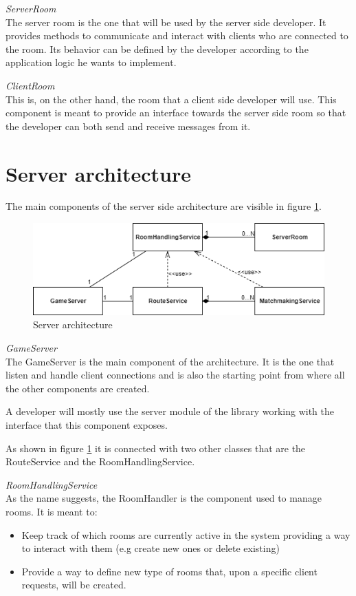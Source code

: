 \bigskip
\textit{ServerRoom}
\\
The server room is the one that will be used by the server side developer. It provides methods to communicate and interact with clients who are connected to the room. Its behavior can be defined by the developer according to the application logic he wants to implement.

\bigskip
\textit{ClientRoom}
\\
This is, on the other hand, the room that a client side developer will use. This component is meant to provide an interface towards the server side room so that the developer can both send and receive messages from it.

\section{Server architecture} \label{sec:server_arch}
The main components of the server side architecture are visible in figure \ref{fig:server_classes}. 

\begin{figure}[H]
	\centering
	\includegraphics[scale=0.7]{images/3-architecture/server-architecture.png}
	\caption{Server architecture}
	\label{fig:server_classes}
\end{figure}

\bigskip
\textit{GameServer}
\\
The GameServer is the main component of the architecture. It is the one that listen and handle client connections and is also the starting point from where all the other components are created.

A developer will mostly use the server module of the library working with the interface that this component exposes.

As shown in figure \ref{fig:server_classes} it is connected with two other classes that are the RouteService and the RoomHandlingService.

\bigskip
\textit{RoomHandlingService}
\\
As the name suggests, the RoomHandler is the component used to manage rooms. It is meant to: 
\begin{itemize}
	\item Keep track of which rooms are currently active in the system providing a way to interact with them (e.g create new ones or delete existing)
	\item Provide a way to define new type of rooms that, upon a specific client requests, will be created.
\end{itemize}

